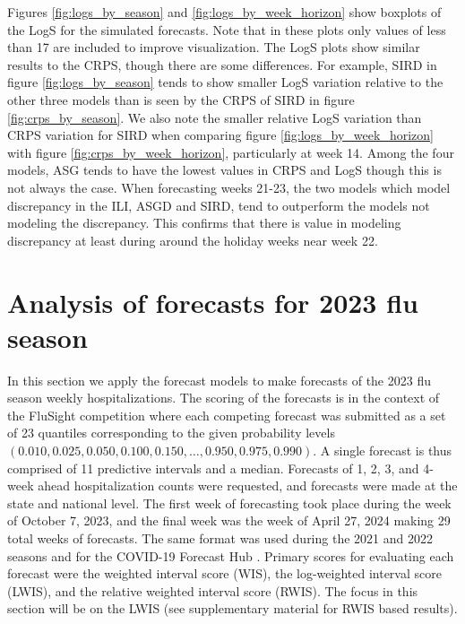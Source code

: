 \documentclass[ba]{imsart}
\theoremstyle{plain}
\theoremstyle{definition}
\theoremstyle{remark}
\begin{document}
Figures \ref{fig:logs_by_season} and \ref{fig:logs_by_week_horizon} show boxplots of the LogS for the simulated forecasts. Note that in these plots only values of less than 17 are included to improve visualization.
The LogS plots show similar results to the CRPS, though there are some differences. For example, SIRD in figure \ref{fig:logs_by_season} tends to show smaller LogS variation relative to the other three models than is seen by the CRPS of SIRD in figure \ref{fig:crps_by_season}. 
We also note the smaller relative LogS variation than CRPS variation for SIRD when comparing figure \ref{fig:logs_by_week_horizon} with figure \ref{fig:crps_by_week_horizon}, particularly at week 14. 
Among the four models, ASG tends to have the lowest values in CRPS and LogS though this is not always the case. When forecasting weeks 21-23, the two models which model discrepancy in the ILI, ASGD and SIRD, tend to outperform the models not modeling the discrepancy. This confirms that there is value in modeling discrepancy at least during around the holiday weeks near week 22. 



























\section{Analysis of forecasts for 2023 flu season}
\label{sec:analysis}

In this section we apply the forecast models to make forecasts of the 2023 flu season weekly hospitalizations. The scoring of the forecasts is in the context of the FluSight competition where each competing forecast was submitted as a set of 23 quantiles corresponding to the given probability levels $(0.010, 0.025, 0.050, 0.100, 0.150, …, 0.950, 0.975, 0.990)$. A single forecast is thus comprised of 11 predictive intervals and a median.
Forecasts of 1, 2, 3, and 4-week ahead hospitalization counts were requested, and forecasts were made at the state and national level. The first week of forecasting took place during the week of October 7, 2023, and the final week was the week of April 27, 2024 making 29 total weeks of forecasts.
 The same format was used during the 2021 and 2022 seasons and for the COVID-19 Forecast Hub \cite[]{mathis2024evaluation, bracher2021evaluating}. 
 Primary scores for evaluating each forecast were the weighted interval score (WIS), the log-weighted interval score (LWIS), and the relative weighted interval score (RWIS). The focus in this section will be on the LWIS (see supplementary material for RWIS based results).
\end{document}

